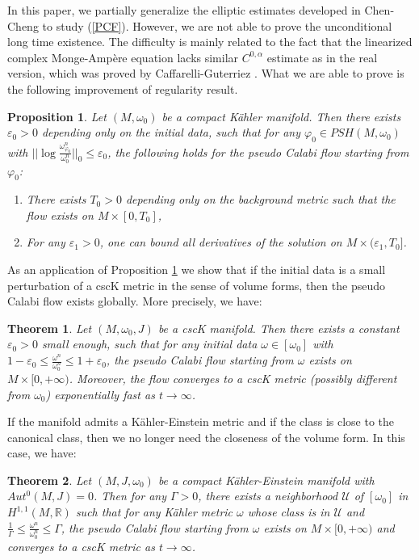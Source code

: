 \documentclass[11pt]{amsart}
\newtheorem{thm}{Theorem}[section]
\newtheorem{prop}[lem]{Proposition}
\numberwithin{equation}{section}
\newcommand{\bR}{ \mathbb{R}} %
\newcommand \eps{\varepsilon}
\begin{document}
In this paper,  we partially generalize the elliptic estimates developed in Chen-Cheng \cite{cc1} to study (\ref{PCF}).  However,  we are not able to prove the unconditional long time existence.  The difficulty is mainly related to the fact that the linearized complex Monge-Ampère equation lacks similar $C^{0,\alpha}$ estimate as in the real version,  which was proved by Caffarelli-Guterriez \cite{CG}.  What we are able to prove is the following improvement of regularity result.
\begin{prop}\label{p1.1}
Let $(M,\omega_0)$ be a compact K\"ahler manifold.  Then there exists $\eps_0>0$ depending only on the initial data,  such that for any $\varphi_0\in PSH(M,\omega_0)$ with $||\log\frac{\omega_{\varphi_0}^n}{\omega_0^n}||_0\le \eps_0$,  the following holds for the pseudo Calabi flow starting from $\varphi_0$:
\begin{enumerate}
\item There exists $T_0>0$ depending only on the background metric such that the flow exists on $M\times [0,T_0]$,
\item For any $\eps_1>0$,  one can bound all derivatives of the solution on $M\times (\eps_1,T_0]$.
\end{enumerate}
\end{prop}

As an application of Proposition \ref{p1.1} we show that if the initial data is a small perturbation of a cscK metric in the sense of volume forms,  then the pseudo Calabi flow exists globally.  More precisely,  we have:
\begin{thm}\label{t1.2}
Let $(M,\omega_0,J)$ be a cscK manifold.  Then there exists a constant $\eps_0>0$ small enough,  such that for any initial data $\omega\in [\omega_0]$ with $1-\eps_0\le \frac{\omega^n}{\omega_0^n}\le 1+\eps_0$,  the pseudo Calabi flow starting from $\omega$ exists on $M\times [0,+\infty)$.  Moreover,  the flow converges to a cscK metric (possibly different from $\omega_0$) exponentially fast as $t\rightarrow \infty$.
\end{thm}

If the manifold admits a K\"ahler-Einstein metric and if the class is close to the canonical class,  then we no longer need the closeness of the volume form.  In this case,  we have:
\begin{thm}\label{t1.3}
Let $(M,J,\omega_0)$ be a compact K\"ahler-Einstein manifold with $Aut^0(M,J)=0$.  Then for any $\Gamma>0$,  there exists a neighborhood $\mathcal{U}$ of $[\omega_0]$ in $H^{1,1}(M,\bR)$ such that for any K\"ahler metric $\omega$ whose class is in $\mathcal{U}$ and $\frac{1}{\Gamma}\le \frac{\omega^n}{\omega_0^n}\le \Gamma$,  the pseudo Calabi flow starting from $\omega$ exists on $M\times [0,+\infty)$ and converges to a cscK metric as $t\rightarrow \infty$. 
\end{thm}
\end{document}
